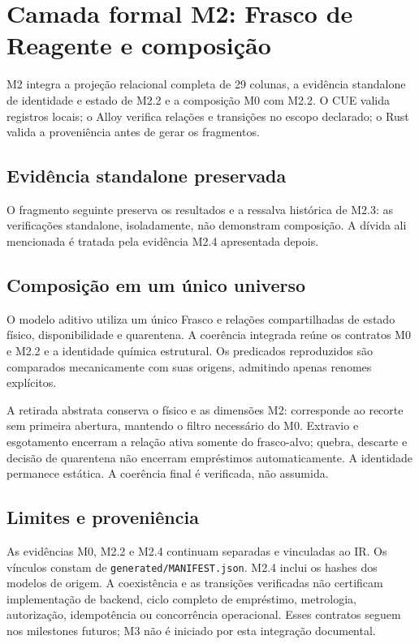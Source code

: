 \clearpage
\section{Camada formal M2: Frasco de Reagente e composição}
\label{sec:formal-m2}
M2 integra a projeção relacional completa de 29 colunas, a evidência
standalone de identidade e estado de M2.2 e a composição M0 com M2.2.
O CUE valida registros locais; o Alloy verifica relações e transições no
escopo declarado; o Rust valida a proveniência antes de gerar os fragmentos.



\clearpage
\subsection*{Evidência standalone preservada}
O fragmento seguinte preserva os resultados e a ressalva histórica de M2.3:
as verificações standalone, isoladamente, não demonstram composição.
A dívida ali mencionada é tratada pela evidência M2.4 apresentada depois.
\begingroup
\small
\raggedright

\par
\endgroup

\clearpage
\subsection*{Composição em um único universo}
O modelo aditivo utiliza um único Frasco e relações compartilhadas de estado
físico, disponibilidade e quarentena. A coerência integrada reúne os contratos
M0 e M2.2 e a identidade química estrutural. Os predicados reproduzidos são
comparados mecanicamente com suas origens, admitindo apenas renomes explícitos.

A retirada abstrata conserva o físico e as dimensões M2: corresponde ao
recorte sem primeira abertura, mantendo o filtro necessário do M0.
Extravio e esgotamento encerram a relação ativa somente do frasco-alvo;
quebra, descarte e decisão de quarentena não encerram empréstimos automaticamente.
A identidade permanece estática. A coerência final é verificada, não assumida.

\begingroup
\small
\raggedright

\par
\endgroup

\subsection*{Limites e proveniência}
As evidências M0, M2.2 e M2.4 continuam separadas e vinculadas ao IR.
Os vínculos constam de \texttt{generated/}\allowbreak\texttt{MANIFEST.json}.
M2.4 inclui os hashes dos modelos de origem.
A coexistência e as transições verificadas não certificam implementação
de backend, ciclo completo de empréstimo, metrologia, autorização,
idempotência ou concorrência operacional. Esses contratos seguem nos
milestones futuros; M3 não é iniciado por esta integração documental.
\par
